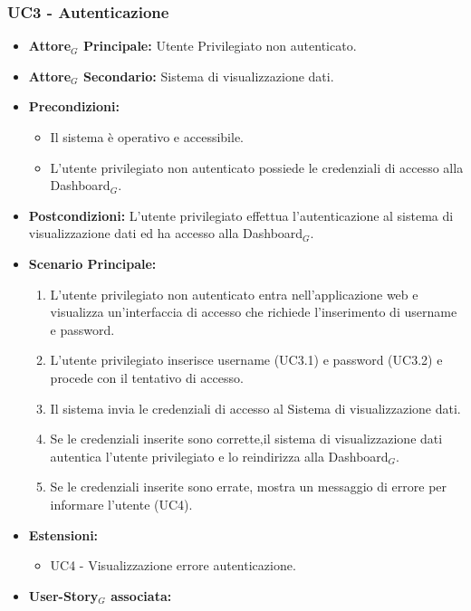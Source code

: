 \documentclass[11pt]{article}
\begin{document}
\begin{justify}
\subsubsection{\textbf{UC3 - Autenticazione}}
\begin{itemize}
     \item \textbf{Attore$_G$ Principale:} Utente Privilegiato non autenticato.
     \item \textbf{Attore$_G$ Secondario:} Sistema di visualizzazione dati.
     \item \textbf{Precondizioni:}
        \begin{itemize}
            \item Il sistema è operativo e accessibile.
            \item L'utente privilegiato non autenticato possiede le credenziali di accesso alla Dashboard$_G$.
        \end{itemize}
     \item \textbf{Postcondizioni:} L'utente privilegiato effettua l'autenticazione al sistema di visualizzazione dati ed ha accesso alla Dashboard$_G$.
     \item \textbf{Scenario Principale:}
        \begin{enumerate}
            \item L'utente privilegiato non autenticato entra nell'applicazione web e visualizza un'interfaccia di accesso che richiede l'inserimento di username e password.
            \item L'utente privilegiato inserisce username (UC3.1) e password (UC3.2) e procede con il tentativo di accesso.
            \item Il sistema invia le credenziali di accesso al Sistema di visualizzazione dati.
            \item Se le credenziali inserite sono corrette,il sistema di visualizzazione dati autentica l’utente privilegiato e lo reindirizza alla Dashboard$_G$.
            \item Se le credenziali inserite sono errate, mostra un messaggio di errore per informare l’utente (UC4).
        \end{enumerate}
     \item \textbf{Estensioni:}
        \begin{itemize}
            \item UC4 - Visualizzazione errore autenticazione.
        \end{itemize}
     \item \textbf{User-Story$_G$ associata:}

\end{itemize}
\end{justify}
\end{document}
